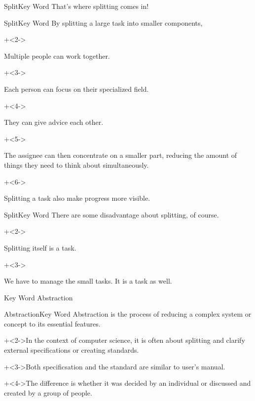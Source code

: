 \begin{frame}{Split}{Key Word}
    {\Large That's where splitting comes in!}
\end{frame}


\begin{frame}{Split}{Key Word}
    By splitting a large task into smaller components,
    \vspace{4ex}

    \begin{itemize}
        \onslide+<2->{\item Multiple people can work together.
            \begin{itemize}
                \onslide+<3->{\item Each person can focus on their specialized field.}
                \onslide+<4->{\item They can give advice each other.}
            \end{itemize}}
        \onslide+<5->{\item The assignee can then concentrate on a smaller part, reducing the amount of things they need to think about simultaneously.}
        \onslide+<6->{\item Splitting a task also make progress more visible.}
    \end{itemize}
\end{frame}


\begin{frame}{Split}{Key Word}
    There are some disadvantage about splitting, of course.
    \vspace{4ex}

    \begin{itemize}
        \onslide+<2->{\item Splitting itself is a task.}
        \onslide+<3->{\item We have to manage the small tasks. It is a task as well.}
    \end{itemize}
\end{frame}


\begin{frame}{Key Word}{}
    {\Huge Abstraction}
\end{frame}


\begin{frame}{Abstraction}{Key Word}
    Abstraction is the process of reducing a complex system or concept to its essential features.
    \vspace{4ex}

    \onslide+<2->{In the context of computer science, it is often about splitting and clarify external specifications or creating standards.}
    \vspace{2ex}

    \onslide+<3->{Both specificsation and the standard are similar to user's manual.}
    \vspace{2ex}

    \onslide+<4->{The difference is whether it was decided by an individual or discussed and created by a group of people.}
\end{frame}


